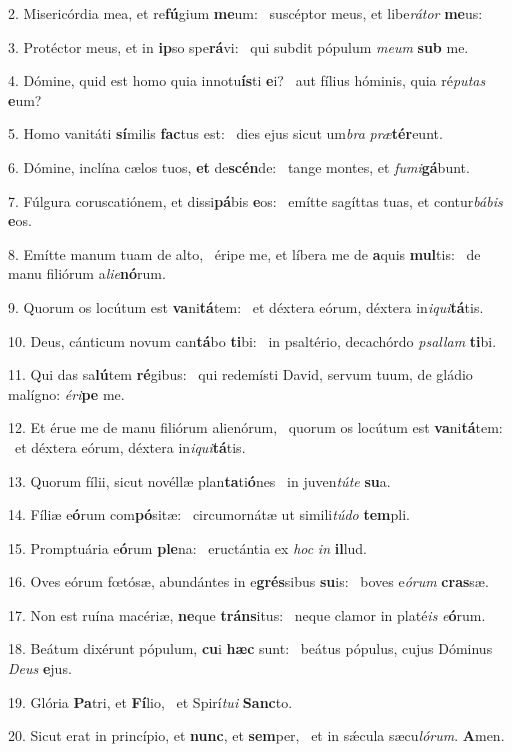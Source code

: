 2. Misericórdia mea, et re\textbf{fú}gium \textbf{me}um: \ast\  suscéptor meus, et libe\textit{rá}\textit{tor} \textbf{me}us:\

3. Protéctor meus, et in \textbf{ip}so spe\textbf{rá}vi: \ast\  qui subdit pópulum \textit{me}\textit{um} \textbf{sub} me.\

4. Dómine, quid est homo quia innotu\textbf{ís}ti \textbf{e}i? \ast\  aut fílius hóminis, quia ré\textit{pu}\textit{tas} \textbf{e}um?\

5. Homo vanitáti \textbf{sí}milis \textbf{fac}tus est: \ast\  dies ejus sicut um\textit{bra} \textit{præ}\textbf{tér}eunt.\

6. Dómine, inclína cælos tuos, \textbf{et} de\textbf{scén}de: \ast\  tange montes, et \textit{fu}\textit{mi}\textbf{gá}bunt.\

7. Fúlgura coruscatiónem, et dissi\textbf{pá}bis \textbf{e}os: \ast\  emítte sagíttas tuas, et contur\textit{bá}\textit{bis} \textbf{e}os.\

8. Emítte manum tuam de alto, \dag\  éripe me, et líbera me de \textbf{a}quis \textbf{mul}tis: \ast\  de manu filiórum a\textit{li}\textit{e}\textbf{nó}rum.\

9. Quorum os locútum est \textbf{va}ni\textbf{tá}tem: \ast\  et déxtera eórum, déxtera in\textit{i}\textit{qui}\textbf{tá}tis.\

10. Deus, cánticum novum can\textbf{tá}bo \textbf{ti}bi: \ast\  in psaltério, decachórdo \textit{psal}\textit{lam} \textbf{ti}bi.\

11. Qui das sa\textbf{lú}tem \textbf{ré}gibus: \ast\  qui redemísti David, servum tuum, de gládio malígno: \textit{é}\textit{ri}\textbf{pe} me.\

12. Et érue me de manu filiórum alienórum, \dag\  quorum os locútum est \textbf{va}ni\textbf{tá}tem: \ast\  et déxtera eórum, déxtera in\textit{i}\textit{qui}\textbf{tá}tis.\

13. Quorum fílii, sicut novéllæ plan\textbf{ta}ti\textbf{ó}nes \ast\  in juven\textit{tú}\textit{te} \textbf{su}a.\

14. Fíliæ e\textbf{ó}rum com\textbf{pó}sitæ: \ast\  circumornátæ ut simili\textit{tú}\textit{do} \textbf{tem}pli.\

15. Promptuária e\textbf{ó}rum \textbf{ple}na: \ast\  eructántia ex \textit{hoc} \textit{in} \textbf{il}lud.\

16. Oves eórum fœtósæ, abundántes in e\textbf{grés}sibus \textbf{su}is: \ast\  boves e\textit{ó}\textit{rum} \textbf{cras}sæ.\

17. Non est ruína macériæ, \textbf{ne}que \textbf{tráns}itus: \ast\  neque clamor in platé\textit{is} \textit{e}\textbf{ó}rum.\

18. Beátum dixérunt pópulum, \textbf{cu}i \textbf{hæc} sunt: \ast\  beátus pópulus, cujus Dóminus \textit{De}\textit{us} \textbf{e}jus.\

19. Glória \textbf{Pa}tri, et \textbf{Fí}lio, \ast\  et Spirí\textit{tu}\textit{i} \textbf{Sanc}to.\

20. Sicut erat in princípio, et \textbf{nunc}, et \textbf{sem}per, \ast\  et in sǽcula sæcu\textit{ló}\textit{rum}. \textbf{A}men.\

